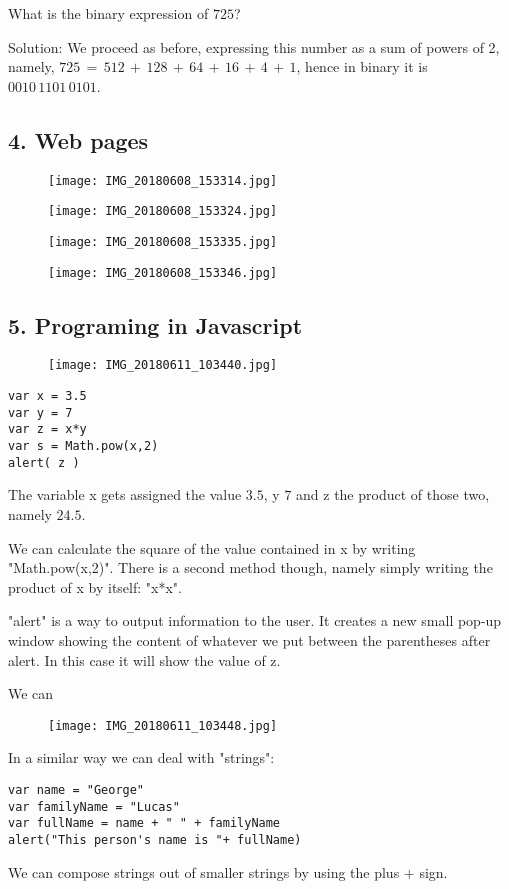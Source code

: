 \documentclass{article}
\begin{document}
What is the binary expression of $725$? 

Solution: We proceed as before, expressing this number as a sum of powers of 2,
namely, $725\,=\,512\,+\,128\,+\,64\,+\,16\,+\,4\,+\,1$, hence in binary it is
$0010\,1101\,0101$.

\subsection{4. Web pages}
\begin{figure}[H]
\texttt{[image: IMG\_20180608\_153314.jpg]}
\end{figure}
\begin{figure}[H]
\texttt{[image: IMG\_20180608\_153324.jpg]}
\end{figure}
\begin{figure}[H]
\texttt{[image: IMG\_20180608\_153335.jpg]}
\end{figure}
\begin{figure}[H]
\texttt{[image: IMG\_20180608\_153346.jpg]}
\end{figure}

\subsection{5. Programing in Javascript}
\begin{figure}[H]
\texttt{[image: IMG\_20180611\_103440.jpg]}
\end{figure}
\begin{lstlisting}
var x = 3.5
var y = 7
var z = x*y
var s = Math.pow(x,2)
alert( z )
\end{lstlisting}
The variable x gets assigned the value $3.5$, y $7$ and z the product of those two,
namely $24.5$.

We can calculate the square of the value contained in x by writing "Math.pow(x,2)". 
There is a second method though, namely simply writing the product of x by itself: "x*x".

"alert" is a way to output information to the user. It creates a new small pop-up window showing
the content of whatever we put between the parentheses after alert. In this case it will show the
value of z.

We can 
\begin{figure}[H]
\texttt{[image: IMG\_20180611\_103448.jpg]}
\end{figure}
In a similar way we can deal with "strings":
\begin{lstlisting}
var name = "George"
var familyName = "Lucas"
var fullName = name + " " + familyName
alert("This person's name is "+ fullName)
\end{lstlisting}
We can compose strings out of smaller strings by using the plus $+$ sign. 
\end{document}
